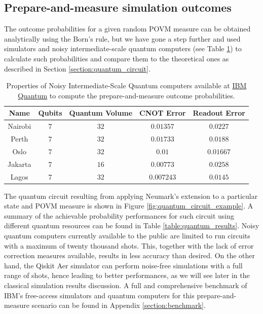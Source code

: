 \subsection{Prepare-and-measure simulation outcomes}
The outcome probabilities for a given random POVM measure can be obtained analytically using the Born's rule, but we have gone a step further and used simulators and noisy intermediate-scale quantum computers (see Table \ref{table:quantum_resources}) to calculate such probabilities and compare them to the theoretical ones as described in Section \ref{section:quantum_circuit}. 
\newline
\begin{table}[h!]
\centering
{\renewcommand{\arraystretch}{1.2}%
\begin{tabular}{c c c c c} 
 \toprule
 Name & Qubits & Quantum Volume & CNOT Error & Readout Error \\ \hline
 Nairobi    & $\scriptstyle7$ 
            & $\scriptstyle32$ 
            & $\scriptstyle0.01357$ 
            & $\scriptstyle0.0227$ \\ 
 Perth      & $\scriptstyle7$ 
            & $\scriptstyle32$ 
            & $\scriptstyle0.01733$ 
            & $\scriptstyle0.0188$ \\ 
 Oslo       & $\scriptstyle7$ 
            & $\scriptstyle32$ 
            & $\scriptstyle0.01$ 
            & $\scriptstyle0.01667$ \\ 
 Jakarta    & $\scriptstyle7$ 
            & $\scriptstyle16$ 
            & $\scriptstyle0.00773$ 
            & $\scriptstyle0.0258$ \\ 
 Lagos      & $\scriptstyle7$ 
            & $\scriptstyle32$ 
            & $\scriptstyle0.007243$ 
            & $\scriptstyle0.0145$ \\ 
 \bottomrule
\end{tabular}}
\caption{Properties of Noisy Intermediate-Scale Quantum computers available at \href{https://quantum-computing.ibm.com}{IBM Quantum} to compute the prepare-and-measure outcome probabilities.}
\label{table:quantum_resources}
\end{table}

The quantum circuit resulting from applying Neumark's extension to a particular state and POVM measure is shown in Figure \ref{fig:quantum_circuit_example}. A summary of the achievable probability performances for such circuit using different quantum resources can be found in Table \ref{table:quantum_results}. Noisy quantum computers currently available to the public are limited to run circuits with a maximum of twenty thousand shots. This, together with the lack of error correction measures available, results in less accuracy than desired. On the other hand, the Qiskit Aer simulator can perform noise-free simulations with a full range of shots, hence leading to better performances, as we will see later in the classical simulation results discussion. A full and comprehensive benchmark of IBM's free-access simulators and quantum computers for this prepare-and-measure scenario can be found in Appendix \ref{section:benchmark}.


